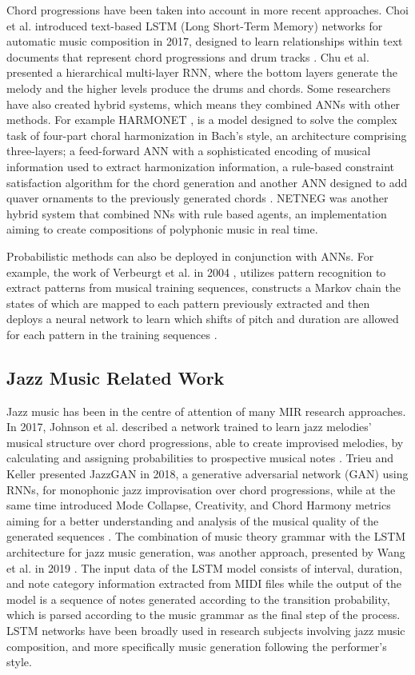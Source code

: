         Chord progressions have been taken into account in more recent approaches. Choi et al. introduced text-based LSTM (Long Short-Term Memory) networks for automatic music composition in 2017, designed to learn relationships within text documents that represent chord progressions and drum tracks \cite{choi2016text}. Chu et al. presented a hierarchical multi-layer RNN, where the bottom layers generate the melody and the higher levels produce the drums and chords. Some researchers have also created hybrid systems, which means they combined ANNs with other methods. For example HARMONET \cite{hild1992harmonet}, is a model designed to solve the complex task of four-part choral harmonization in Bach’s style, an architecture comprising three-layers; a feed-forward ANN with a sophisticated encoding of musical information used to extract harmonization information, a rule-based constraint satisfaction algorithm for the chord generation and another ANN designed to add quaver ornaments to the previously generated chords \cite{aiMethods}. NETNEG \cite{lehmann1996netneg} was another hybrid system that combined NNs with rule based agents, an implementation aiming to create compositions of polyphonic music in real time. 
        
        Probabilistic methods can also be deployed in conjunction with ANNs. For example, the work of Verbeurgt et al. in 2004 , utilizes pattern recognition to extract patterns from musical training sequences, constructs a Markov chain the states of which are mapped to each pattern previously extracted and then deploys a neural network to learn which shifts of pitch and duration are allowed for each pattern in the training sequences \cite{verbeurgt2004hybrid}. 


    \subsection{Jazz Music Related Work}
    Jazz music has been in the centre of attention of many MIR research approaches. In 2017, Johnson et al. described a network trained to learn jazz melodies' musical structure over chord progressions, able to create improvised melodies, by calculating and assigning probabilities to prospective musical notes \cite{johnson2017learning}. Trieu and Keller presented JazzGAN in 2018, a generative adversarial network (GAN) using RNNs, for monophonic jazz improvisation over chord progressions, while at the same time introduced Mode Collapse, Creativity, and Chord Harmony metrics aiming for a better understanding and analysis of the musical quality of the generated sequences  \cite{trieu2018jazzgan}. The combination of music theory grammar with the LSTM architecture for jazz music generation, was another approach, presented by Wang et al. in 2019 \cite{wang2019jazz}. The input data of the LSTM model consists of interval, duration, and note category information extracted from MIDI files while the output of the model is a sequence of notes generated according to the transition probability, which is parsed according to the music grammar as the final step of the process. LSTM networks have been broadly used in research subjects involving jazz music composition, and more specifically music generation following the performer's style. 

